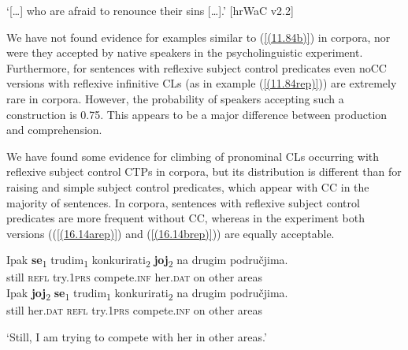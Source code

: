 \begin{exe}\ex
\begin{xlist}
\end{xlist}
\glt ‘[\dots] who are afraid to renounce their sins [\dots].’
\hfill [hrWaC v2.2]
\end{exe}

\noindent We have not found evidence for examples similar to (\ref{(11.84b)}) in corpora, nor were they accepted by native speakers in the psycholinguistic experiment. Furthermore, for sentences with reflexive subject control predicates even noCC versions with reflexive infinitive CLs (as in example (\ref{(11.84rep)})) are extremely rare in corpora. However, the probability of speakers accepting such a construction is 0.75. This appears to be a major difference between production and comprehension.

We have found some evidence for climbing of pronominal CLs occurring with reflexive subject control CTPs in corpora, but its distribution is different than for raising and simple subject control predicates, which appear with CC in the majority of sentences. In corpora, sentences with reflexive subject control predicates are more frequent without CC, whereas in the experiment both versions ((\ref{(16.14arep)}) and (\ref{(16.14brep)})) are equally acceptable. 

\begin{exe}\ex\begin{xlist}
\ex\label{(16.14arep)}
\gll Ipak \textbf{se}\textsubscript{1} trudim\textsubscript{1} konkurirati\textsubscript{2} \textbf{joj}\textsubscript{2} na drugim područjima. \\
 still \textsc{refl} try.\textsc{1prs} compete.\textsc{inf} her.\textsc{dat} on other areas \\
\ex\label{(16.14brep)}
\gll Ipak \textbf{joj}\textsubscript{2} \textbf{se}\textsubscript{1} trudim\textsubscript{1} konkurirati\textsubscript{2} na drugim područjima. \\
 still her.\textsc{dat} \textsc{refl} try.\textsc{1prs} compete.\textsc{inf} on other areas \\
\end{xlist}
\glt ‘Still, I am trying to compete with her in other areas.’
\end{exe}


